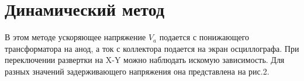 \documentclass[a4paper, 14pt]{extarticle}%
\begin{document}
\section*{Динамический метод}

В этом методе ускоряющее напряжение $V_a$ подается с понижающего трансформатора на анод, а ток с коллектора подается на экран осциллографа. При переключении развертки на X-Y можно наблюдать искомую зависимость. Для разных значений задерживающего напряжения она представлена на рис.2.
\begin{figure}[h]
\begin{minipage}[h]{0.32\linewidth}
\end{minipage}
\hfill
\begin{minipage}[h]{0.32\linewidth}

\end{minipage}
\end{figure}
\end{document}
